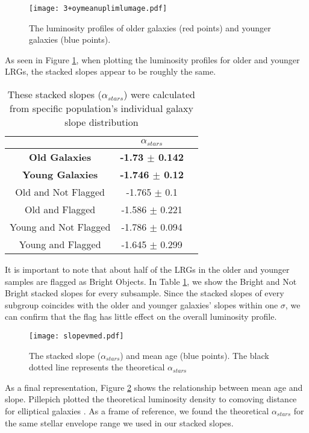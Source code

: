 \documentclass{article}
\begin{document}
\begin{figure}[h!]
\centering
\texttt{[image: 3+oymeanuplimlumage.pdf]}
\caption{The luminosity profiles of older galaxies (red points) and younger galaxies (blue points).}
\label{fig:mesh2}
\end{figure}

As seen in Figure \ref{fig:mesh2}, when plotting the luminosity profiles for older and younger LRGs,  the stacked slopes appear to be roughly the same.

\begin{table}[!htb]
\centering
\begin{tabular}{ccc} \toprule
& \Large{\textbf{\textbf{$\alpha_{stars}$}}}\\ \midrule
\textbf{Old Galaxies} & \textbf{-1.73  $\pm$  0.142}  \\
\textbf{Young Galaxies} & \textbf{-1.746 $\pm$  0.12}\\
Old and Not Flagged & -1.765 $\pm$  0.1 \\
Old and Flagged & -1.586  $\pm$  0.221 \\
Young and Not Flagged & -1.786 $\pm$  0.094 \\
Young and Flagged & -1.645  $\pm$  0.299 \\ \bottomrule
\end{tabular}
\caption{These stacked slopes ($\alpha_{stars}$) were calculated from specific population's individual galaxy slope distribution}
\label{table:3}
\end{table}

It is important to note that about half of the LRGs in the older and younger samples are flagged as Bright Objects. In Table \ref{table:3}, we show the Bright and Not Bright stacked slopes for every subsample. Since the stacked slopes of every subgroup coincides with the older and younger galaxies' slopes within one $\sigma$, we can confirm that the flag has little effect on the overall luminosity profile.

\begin{figure}[h!]
\centering
\texttt{[image: slopevmed.pdf]}
\caption{The stacked slope ($\alpha_{stars}$) and mean age (blue points). The black dotted line represents the theoretical  $\alpha_{stars}$}
\label{fig:svm}
\end{figure}

As a final representation, Figure \ref{fig:svm} shows the relationship between mean age and slope. Pillepich plotted the theoretical luminosity density to comoving distance for elliptical galaxies \cite{Pillepich:2014}. As a frame of reference, we found the theoretical  $\alpha_{stars}$ for the same stellar envelope range we used in our stacked slopes.
\end{document}
